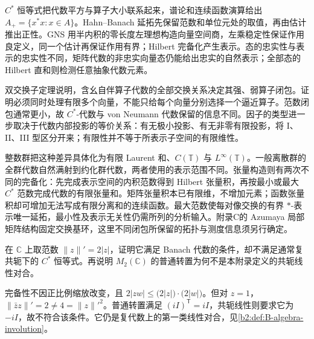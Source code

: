 \begin{chaptersummary}
	\(C^*\) 恒等式把代数平方与算子大小联系起来，谱论和连续函数演算给出 \(A_+=\{x^*x:x\in A\}\)。Hahn--Banach 延拓先保留范数和单位元处的取值，再由估计推出正性。GNS 用半内积的零长度左理想构造向量空间商，左乘稳定性保证作用良定义，同一个估计再保证作用有界；Hilbert 完备化产生表示。态的忠实性与表示的忠实性不同，矩阵代数的非忠实向量态仍能给出忠实的自然表示；全部态的 Hilbert 直和则检测任意抽象代数元素。

	\ProseParagraphBreak
	双交换子定理说明，含幺自伴算子代数的全部交换关系决定其强、弱算子闭包。证明必须同时处理有限多个向量，不能只给每个向量分别选择一个逼近算子。范数闭包通常更小，故 \(C^*\)-代数与 von Neumann 代数保留的信息不同。因子的类型进一步取决于代数内部投影的等价关系：有无极小投影、有无非零有限投影，将 I、II、III 型区分开来；有限性并不等于所表示子空间的有限维性。

	\ProseParagraphBreak
	整数群把这种差异具体化为有限 Laurent 和、\(C(\mathbb T)\) 与 \(L^\infty(\mathbb T)\)。一般离散群的全群代数自然满射到约化群代数，两者使用的表示范围不同。张量构造则有两次不同的完备化：先完成表示空间的内积范数得到 Hilbert 张量积，再按最小或最大 \(C^*\) 范数完成代数的有限张量和。矩阵张量积本已有限维，不增加元素；函数张量积却可增加无法写成有限分离和的连续函数。最大范数使每对像交换的有界 \(*\)-表示唯一延拓，最小性及表示无关性仍需所列的分析输入。附录C的 Azumaya 局部矩阵结构固定交换基环，这里不同闭包所保留的拓扑与测度信息须另行确定。
\end{chaptersummary}

\BookExercises

\begin{exercise}\label{b2:ex:D-norm-and-involution}
	在 \(\mathbb C\) 上取范数 \(\|z\|'=2|z|\)，证明它满足 Banach 代数的条件，却不满足通常复共轭下的 \(C^*\) 恒等式。再说明 \(M_2(\mathbb C)\) 的普通转置为何不是本附录定义的共轭线性对合。
\end{exercise}
\begin{solution}
	完备性不因正比例缩放改变，且 \(2|zw|\le\bigl(2|z|\bigr)\cdot\bigl(2|w|\bigr)\)。但对 \(z=1\)，\(\|\bar z z\|'=2\ne4=\|z\|'^2\)。普通转置满足 \((iI)^{\mathsf T}=iI\)，共轭线性则要求它为 \(-iI\)，故不符合该条件。它仍是复代数上的第一类线性对合，见\cref{b2:def:B-algebra-involution}。
\end{solution}

